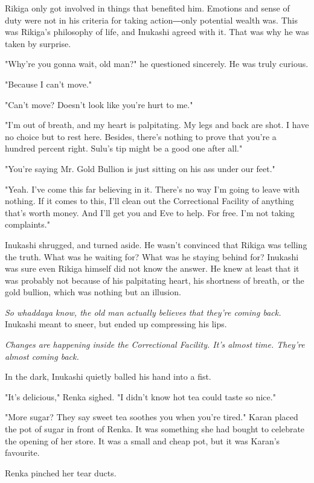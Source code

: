 Rikiga only got involved in things that benefited him. Emotions and
sense of duty were not in his criteria for taking action―only potential
wealth was. This was Rikiga's philosophy of life, and Inukashi agreed
with it. That was why he was taken by surprise.

"Why're you gonna wait, old man?" he questioned sincerely. He was truly
curious.

"Because I can't move."

"Can't move? Doesn't look like you're hurt to me."

"I'm out of breath, and my heart is palpitating. My legs and back are
shot. I have no choice but to rest here. Besides, there's nothing to
prove that you're a hundred percent right. Sulu's tip might be a good
one after all."

"You're saying Mr. Gold Bullion is just sitting on his ass under our
feet."

"Yeah. I've come this far believing in it. There's no way I'm going to
leave with nothing. If it comes to this, I'll clean out the Correctional
Facility of anything that's worth money. And I'll get you and Eve to
help. For free. I'm not taking complaints."

Inukashi shrugged, and turned aside. He wasn't convinced that Rikiga was
telling the truth. What was he waiting for? What was he staying behind
for? Inukashi was sure even Rikiga himself did not know the answer. He
knew at least that it was probably not because of his palpitating heart,
his shortness of breath, or the gold bullion, which was nothing but an
illusion.

\emph{So whaddaya know, the old man actually believes that they're coming
back.} Inukashi meant to sneer, but ended up compressing his lips.

\emph{Changes are happening inside the Correctional Facility. It's almost
time. They're almost coming back.}

In the dark, Inukashi quietly balled his hand into a fist.

\mybreak

"It's delicious," Renka sighed. "I didn't know hot tea could taste so
nice."

"More sugar? They say sweet tea soothes you when you're tired." Karan
placed the pot of sugar in front of Renka. It was something she had
bought to celebrate the opening of her store. It was a small and cheap
pot, but it was Karan's favourite.

Renka pinched her tear ducts.

